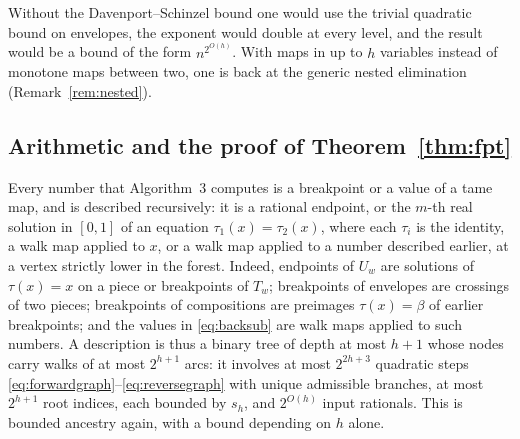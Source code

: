 \documentclass[11pt,a4paper]{article}
\theoremstyle{plain}
\theoremstyle{definition}
\theoremstyle{remark}
\begin{document}
Without the Davenport--Schinzel bound one would use the trivial quadratic bound on envelopes, the exponent would double at every level, and the result would be a bound of the form $n^{2^{O(h)}}$. With maps in up to $h$ variables instead of monotone maps between two, one is back at the generic nested elimination (Remark~\ref{rem:nested}).

\subsection{Arithmetic and the proof of Theorem~\ref{thm:fpt}}
Every number that Algorithm~3 computes is a breakpoint or a value of a tame map, and is described recursively: it is a rational endpoint, or the $m$-th real solution in $[0,1]$ of an equation $\tau_1(x)=\tau_2(x)$, where each $\tau_i$ is the identity, a walk map applied to $x$, or a walk map applied to a number described earlier, at a vertex strictly lower in the forest. Indeed, endpoints of $U_w$ are solutions of $\tau(x)=x$ on a piece or breakpoints of $T_w$; breakpoints of envelopes are crossings of two pieces; breakpoints of compositions are preimages $\tau(x)=\beta$ of earlier breakpoints; and the values in \eqref{eq:backsub} are walk maps applied to such numbers. A description is thus a binary tree of depth at most $h+1$ whose nodes carry walks of at most $2^{h+1}$ arcs: it involves at most $2^{2h+3}$ quadratic steps \eqref{eq:forwardgraph}--\eqref{eq:reversegraph} with unique admissible branches, at most $2^{h+1}$ root indices, each bounded by $s_h$, and $2^{O(h)}$ input rationals. This is bounded ancestry again, with a bound depending on $h$ alone.
\end{document}
